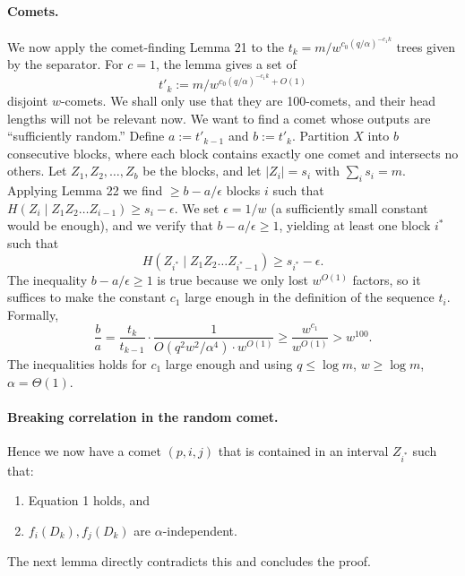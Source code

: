 \documentclass[10pt,a4paper]{article}
\begin{document}
\paragraph{Comets.}
We now apply the comet-finding Lemma 21 to the $t_k=m/w^{c_0(q/\alpha)^{-c_1k}}$ trees given by the separator. For $c=1$, the lemma gives a set of
\[t'_k:=m/w^{c_0(q/\alpha)^{-c_1k}+O(1)}\]
disjoint $w$-comets. We shall only use that they are 100-comets, and their head lengths will not be relevant now. We want to find a comet whose outputs are ``sufficiently random.''
Define $a:=t'_{k-1}$ and $b:=t'_k$.
Partition $X$ into $b$ consecutive blocks, where each block contains exactly one comet and intersects no others. Let $Z_1,Z_2,\ldots,Z_b$ be the blocks, and let $|Z_i|=s_i$ with $\sum_i s_i=m$. Applying Lemma 22 we find $\geq b-a/\epsilon$ blocks $i$ such that $H(Z_i\mid Z_1Z_2\ldots Z_{i-1})\geq s_i-\epsilon$. We set $\epsilon=1/w$ (a sufficiently small constant would be enough), and we verify that $b-a/\epsilon\geq1$, yielding at least one block $i^*$ such that
\[H(Z_{i^*}\mid Z_1Z_2\ldots Z_{i^*-1})\geq s_{i^*}-\epsilon.\tag{1}\]
The inequality $b-a/\epsilon\geq1$ is true because we only lost $w^{O(1)}$ factors, so it suffices to make the constant $c_1$ large enough in the definition of the sequence $t_i$. Formally,
\[\frac ba=\frac{t_k}{t_{k-1}}\cdot\frac1{O(q^2w^2/\alpha^4)\cdot w^{O(1)}}\geq\frac{w^{c_1}}{w^{O(1)}}>w^{100}.\]
The inequalities holds for $c_1$ large enough and using $q\leq\log m$, $w\geq\log m$, $\alpha=\Theta(1)$.
\paragraph{Breaking correlation in the random comet.}
Hence we now have a comet $(p,i,j)$ that is contained in an interval $Z_{i^*}$ such that:
\begin{enumerate}
\item Equation 1 holds, and
\item $f_i(D_k),f_j(D_k)$ are $\alpha$-independent.
\end{enumerate}
The next lemma directly contradicts this and concludes the proof.
\end{document}
